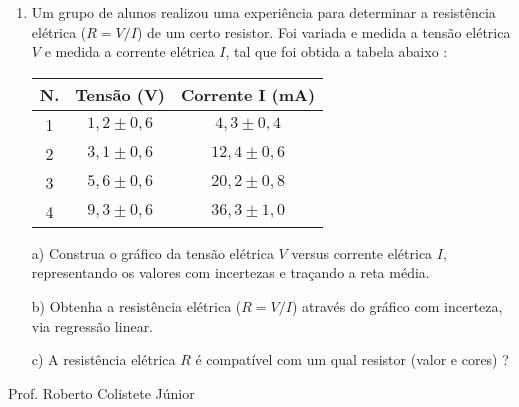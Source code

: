 \documentclass[a4paper,11pt]{report}
\begin{document}
\begin{enumerate}
\item  Um grupo de alunos realizou uma experi\^{e}ncia para determinar a resist\^{e}ncia el\'{e}trica ($R=V/I$) de um certo
resistor. Foi variada e medida a tens\~{a}o el\'{e}trica $V$ e medida a corrente el\'{e}trica $I$, tal que foi obtida a tabela abaixo :
\begin{table}[h]
\centering
\begin{tabular}{|c|c|c|}
\hline
N. & Tens\~{a}o (V) & Corrente I (mA) \\ \hline
1 & $1,2\pm 0,6$ & $4,3\pm 0,4$ \\ \hline
2 & $3,1\pm 0,6$ & $12,4\pm 0,6$ \\ \hline
3 & $5,6\pm 0,6$ & $20,2\pm 0,8$ \\ \hline
4 & $9,3\pm 0,6$ & $36,3\pm 1,0$ \\ \hline
\end{tabular}
\end{table}

a) Construa o gr\'{a}fico da tens\~{a}o el\'{e}trica $V$ versus corrente el\'{e}trica $I$, 
representando os va\-lo\-res com in\-cer\-te\-zas e tra\c{c}ando a reta m\'{e}dia.

b) Obtenha a resist\^{e}ncia el\'{e}trica ($R=V/I$) atrav\'{e}s do gr\'{a}fico com
incerteza, via regress\~{a}o linear.

c) A resist\^{e}ncia el\'{e}trica $R$ \'{e} compat\'{i}vel com um qual resistor (valor e cores) ?

\end{enumerate}

\begin{center}
\bigskip
\bigskip 

Prof. Roberto Colistete J\'{u}nior
\end{center}
\end{document}
